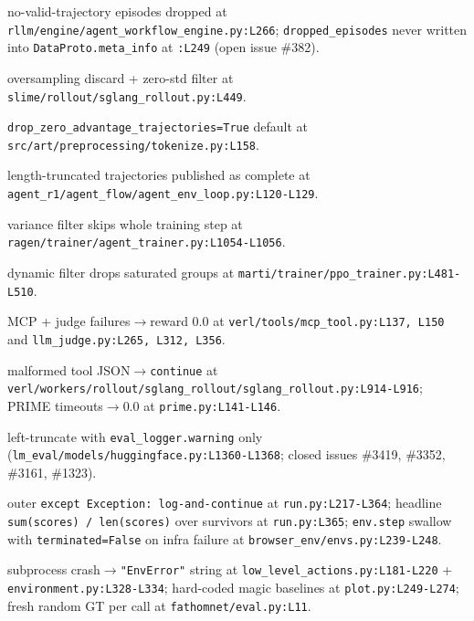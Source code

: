 \documentclass{article}
\begin{document}
\begin{description}[leftmargin=0pt,itemindent=0pt,labelindent=0pt,labelsep=0.4em,itemsep=2pt,topsep=2pt,parsep=0pt,font=\normalfont\bfseries]
\item[rllm (Berkeley Sky):] no-valid-trajectory episodes
dropped at \texttt{rllm/engine/}\allowbreak\texttt{agent\_workflow\_engine.py:L266};
\texttt{dropped\_episodes} never written into
\texttt{DataProto.meta\_info} at \texttt{:L249} (open issue
\#382).

\item[slime:] oversampling discard + zero-std filter at
\texttt{slime/rollout/sglang\_rollout.py:L449}.

\item[ART:] \texttt{drop\_zero\_advantage\_trajectories=True}
default at \texttt{src/art/preprocessing/tokenize.py:L158}.

\item[Agent-R1:] length-truncated trajectories published as
complete at
\texttt{agent\_r1/agent\_flow/agent\_env\_loop.py:L120-L129}.

\item[RAGEN:] variance filter skips whole training step at
\texttt{ragen/trainer/}\allowbreak\texttt{agent\_trainer.py:L1054-L1056}.

\item[MARTI:] dynamic filter drops saturated groups at
\texttt{marti/trainer/ppo\_trainer.py:L481-L510}.

\item[MATPO:] MCP + judge failures$\to$reward 0.0 at
\texttt{verl/tools/mcp\_tool.py:L137, L150} and
\texttt{llm\_judge.py:L265, L312, L356}.

\item[RL-Factory:] malformed tool
JSON$\to$\texttt{continue} at
\texttt{verl/workers/rollout/}\allowbreak\texttt{sglang\_rollout/}\allowbreak\texttt{sglang\_rollout.py:L914-L916};
PRIME timeouts$\to$0.0 at \texttt{prime.py:L141-L146}.

\item[lm-evaluation-harness:] left-truncate with
\texttt{eval\_logger.warning} only
(\texttt{lm\_eval/models/huggingface.py:L1360-L1368}; closed
issues \#3419, \#3352, \#3161, \#1323).

\item[WebArena:] outer \texttt{except Exception:
log-and-continue} at \texttt{run.py:L217-L364}; headline
\texttt{sum(scores) / len(scores)} over survivors at
\texttt{run.py:L365}; \texttt{env.step} swallow with
\texttt{terminated=False} on infra failure at
\texttt{browser\_env/envs.py:L239-L248}.

\item[MLAgentBench:] subprocess
crash$\to$\texttt{"EnvError"} string at
\texttt{low\_level\_actions.py:L181-L220} +
\texttt{environment.py:L328-L334}; hard-coded magic baselines
at \texttt{plot.py:L249-L274}; fresh random GT per call at
\texttt{fathomnet/eval.py:L11}.


\end{description}
\end{document}
